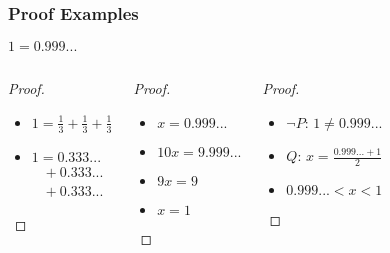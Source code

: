 \documentclass[dvipsnames]{beamer}
\begin{document}
\begin{frame}
  \frametitle{Proof Examples}

  \begin{theorem}
    $1 = 0.999...$
  \end{theorem}

  \pause
  \begin{columns}[t]
    \begin{proof}
      \begin{itemize}
        \item $1 = \frac{1}{3} + \frac{1}{3} + \frac{1}{3}$
        \item $1 = 0.333...$\\
        ~~$+~0.333...$\\
        ~~$+~0.333...$
      \end{itemize}
    \end{proof}

    \pause
    \begin{proof}
      \begin{itemize}
        \item $x = 0.999...$
        \item $10x = 9.999...$
        \item $9x = 9$
        \item $x = 1$
      \end{itemize}
    \end{proof}

    \pause
    \begin{proof}
      \begin{itemize}
        \item $\neg P$: $1 \neq 0.999...$
        \item $Q$: $x= \frac{0.999... + 1}{2}$
        \item $0.999... < x < 1$
      \end{itemize}
    \end{proof}
  \end{columns}
\end{frame}
%
%
%
\end{document}
